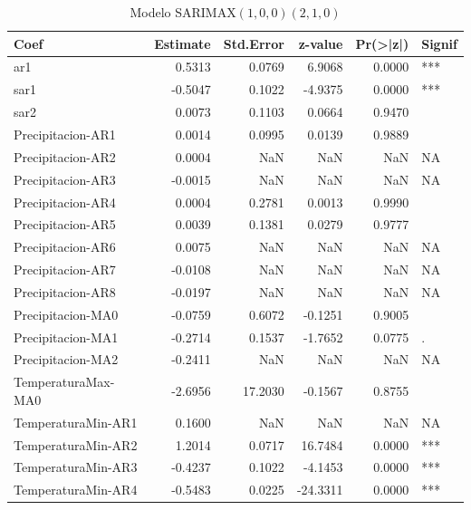 \documentclass[12pt,oneside]{book}\usepackage[]{graphicx}\usepackage[]{color}
\newenvironment{knitrout}{}{} %
\theoremstyle{definition} %
\begin{document}
\begin{knitrout}
\color{fgcolor}\begin{table}

\caption{\label{tab:unnamed-chunk-51}\label{tab:sarimax_estim1}Modelo SARIMAX$(1,0,0)(2,1,0)$}
\centering
\begin{threeparttable}
\begin{tabular}[t]{lrrrrl}
\toprule
Coef & Estimate & Std.Error & z-value & Pr(>|z|) & Signif\\
\midrule
\rowcolor{gray!6}  ar1 & 0.5313 & 0.0769 & 6.9068 & 0.0000 & ***\\
sar1 & -0.5047 & 0.1022 & -4.9375 & 0.0000 & ***\\
\rowcolor{gray!6}  sar2 & 0.0073 & 0.1103 & 0.0664 & 0.9470 & \\
Precipitacion-AR1 & 0.0014 & 0.0995 & 0.0139 & 0.9889 & \\
\rowcolor{gray!6}  Precipitacion-AR2 & 0.0004 & NaN & NaN & NaN & NA\\
\addlinespace
Precipitacion-AR3 & -0.0015 & NaN & NaN & NaN & NA\\
\rowcolor{gray!6}  Precipitacion-AR4 & 0.0004 & 0.2781 & 0.0013 & 0.9990 & \\
Precipitacion-AR5 & 0.0039 & 0.1381 & 0.0279 & 0.9777 & \\
\rowcolor{gray!6}  Precipitacion-AR6 & 0.0075 & NaN & NaN & NaN & NA\\
Precipitacion-AR7 & -0.0108 & NaN & NaN & NaN & NA\\
\addlinespace
\rowcolor{gray!6}  Precipitacion-AR8 & -0.0197 & NaN & NaN & NaN & NA\\
Precipitacion-MA0 & -0.0759 & 0.6072 & -0.1251 & 0.9005 & \\
\rowcolor{gray!6}  Precipitacion-MA1 & -0.2714 & 0.1537 & -1.7652 & 0.0775 & .\\
Precipitacion-MA2 & -0.2411 & NaN & NaN & NaN & NA\\
\rowcolor{gray!6}  TemperaturaMax-MA0 & -2.6956 & 17.2030 & -0.1567 & 0.8755 & \\
\addlinespace
TemperaturaMin-AR1 & 0.1600 & NaN & NaN & NaN & NA\\
\rowcolor{gray!6}  TemperaturaMin-AR2 & 1.2014 & 0.0717 & 16.7484 & 0.0000 & ***\\
TemperaturaMin-AR3 & -0.4237 & 0.1022 & -4.1453 & 0.0000 & ***\\
\rowcolor{gray!6}  TemperaturaMin-AR4 & -0.5483 & 0.0225 & -24.3311 & 0.0000 & ***\\

\end{tabular}
\end{threeparttable}
\end{table}
\end{knitrout}
\end{document}
